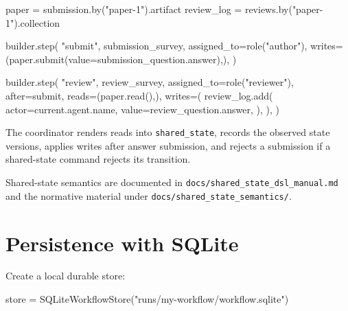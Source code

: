 \documentclass[
  10pt,
]{report}
\newenvironment{Shaded}{}{}
\newcommand{\NormalTok}[1]{#1}
\newcommand{\OperatorTok}[1]{\textcolor[rgb]{0.40,0.40,0.40}{#1}}
\newcommand{\StringTok}[1]{\textcolor[rgb]{0.25,0.44,0.63}{#1}}
\begin{document}
\begin{Shaded}
\begin{Highlighting}[]
\NormalTok{paper }\OperatorTok{=}\NormalTok{ submission.by(}\StringTok{"paper{-}1"}\NormalTok{).artifact}
\NormalTok{review\_log }\OperatorTok{=}\NormalTok{ reviews.by(}\StringTok{"paper{-}1"}\NormalTok{).collection}

\NormalTok{builder.step(}
    \StringTok{"submit"}\NormalTok{,}
\NormalTok{    submission\_survey,}
\NormalTok{    assigned\_to}\OperatorTok{=}\NormalTok{role(}\StringTok{"author"}\NormalTok{),}
\NormalTok{    writes}\OperatorTok{=}\NormalTok{(paper.submit(value}\OperatorTok{=}\NormalTok{submission\_question.answer),),}
\NormalTok{)}

\NormalTok{builder.step(}
    \StringTok{"review"}\NormalTok{,}
\NormalTok{    review\_survey,}
\NormalTok{    assigned\_to}\OperatorTok{=}\NormalTok{role(}\StringTok{"reviewer"}\NormalTok{),}
\NormalTok{    after}\OperatorTok{=}\NormalTok{submit,}
\NormalTok{    reads}\OperatorTok{=}\NormalTok{(paper.read(),),}
\NormalTok{    writes}\OperatorTok{=}\NormalTok{(}
\NormalTok{        review\_log.add(}
\NormalTok{            actor}\OperatorTok{=}\NormalTok{current.agent.name,}
\NormalTok{            value}\OperatorTok{=}\NormalTok{review\_question.answer,}
\NormalTok{        ),}
\NormalTok{    ),}
\NormalTok{)}
\end{Highlighting}
\end{Shaded}

The coordinator renders reads into \texttt{shared\_state}, records the
observed state versions, applies writes after answer submission, and
rejects a submission if a shared-state command rejects its transition.

Shared-state semantics are documented in
\texttt{docs/shared\_state\_dsl\_manual.md} and the normative material
under \texttt{docs/shared\_state\_semantics/}.

\chapter{Persistence with SQLite}\label{persistence-with-sqlite}

Create a local durable store:

\begin{Shaded}
\begin{Highlighting}[]
\NormalTok{store }\OperatorTok{=}\NormalTok{ SQLiteWorkflowStore(}\StringTok{"runs/my{-}workflow/workflow.sqlite"}\NormalTok{)}
\end{Highlighting}
\end{Shaded}
\end{document}
